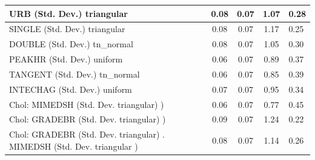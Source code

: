 \begin{table}
\begin{center}
\begin{tabular}{|l|l|c|c|c|l|}
			\hline
			URB (Std. Dev.) triangular &  & 0.08 & 0.07 & 1.07 & 0.28 \\
			\hline
			SINGLE (Std. Dev.) triangular &  & 0.08 & 0.07 & 1.17 & 0.25 \\
			\hline
			DOUBLE (Std. Dev.) tn_normal &  & 0.08 & 0.07 & 1.05 & 0.30 \\
			\hline
			PEAKHR (Std. Dev.) uniform &  & 0.06 & 0.07 & 0.89 & 0.37 \\
			\hline
			TANGENT (Std. Dev.) tn_normal &  & 0.06 & 0.07 & 0.85 & 0.39 \\
			\hline
			INTECHAG (Std. Dev.) uniform &  & 0.07 & 0.07 & 0.95 & 0.34 \\
			\hline
			 Chol: MIMEDSH (Std. Dev. triangular) ) &  & 0.06 & 0.07 & 0.77 & 0.45 \\
			\hline
			 Chol: GRADEBR (Std. Dev. triangular) ) &  & 0.09 & 0.07 & 1.24 & 0.22 \\
			\hline
			 Chol: GRADEBR (Std. Dev. triangular) . MIMEDSH (Std. Dev.   triangular ) &  & 0.08 & 0.07 & 1.14 & 0.26 \\
			\hline
		\end{tabular}
	\end{center}
\end{table}